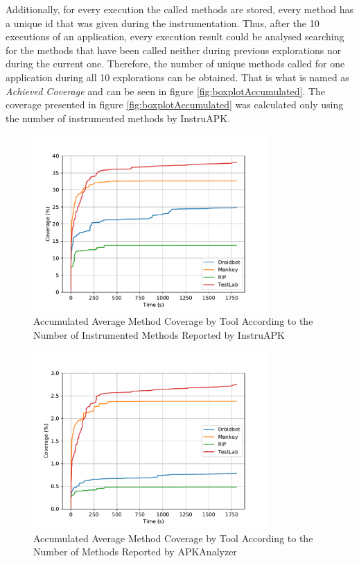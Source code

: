 Additionally, for every execution the called methods are stored, every method has a unique id that was given during the instrumentation. Thus, after the 10 executions of an application, every execution result could be analysed searching for the methods that have been called neither during previous explorations nor during the current one. Therefore, the number of unique methods called for one application during all 10 explorations can be obtained. That is what is named as \textit{Achieved Coverage} and can be seen in figure \ref{fig:boxplotAccumulated}. The coverage presented in figure \ref{fig:boxplotAccumulated} was calculated only using the number of instrumented methods by InstruAPK. 

\begin{figure}[h]
\centering
\includegraphics[width=0.8\textwidth]{../Figures/averageCoverageInstruAPK.pdf}
\caption{Accumulated Average Method Coverage by Tool According to the Number of Instrumented Methods Reported by InstruAPK}\label{fig:averageCoverageInstruAPK}
\end{figure}

\begin{figure}[h]
\centering
\includegraphics[width=0.8\textwidth]{../Figures/averageCoverageAPKAnalyzer.pdf}
\caption{Accumulated Average Method Coverage by Tool According to the Number of Methods Reported by APKAnalyzer}\label{fig:averageCoverageAPKAnalyzer}
\end{figure}

